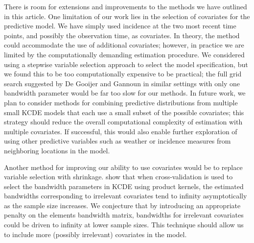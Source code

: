 \documentclass[times, doublespace]{simauth}\usepackage[]{graphicx}\usepackage[]{color}
\begin{document}
There is room for extensions and improvements to the methods we
have outlined in this article.  One limitation of our work lies in the
selection of covariates for the predictive model.  We have simply
used incidence at the two most recent time points, and possibly the observation
time, as covariates.  In theory, the method could accommodate the use of additional covariates; however, in practice we are limited by the computationally demanding estimation procedure.  We considered using a stepwise
variable selection approach to select the model specification,
but we found this to be too computationally expensive to be practical; the full
grid search suggested by De Gooijer and Gannoun
\cite{de2000nonparametricConditionalPredictiveRegions} in similar settings with only one bandwidth parameter would be far too slow for our methods.  In future work, we plan to consider methods for combining predictive distributions from multiple small KCDE models that each use a small subset of the possible covariates; this strategy should reduce the overall computational complexity of estimation with multiple covariates.  If successful, this would also enable further exploration of using other predictive variables such as weather or incidence measures from neighboring locations in the model.

Another method for improving our ability to use covariates would be to replace
variable selection with shrinkage.  \cite{hall2004crossvalidationKCDE}
show that when cross-validation is used to select the bandwidth parameters in
KCDE using product kernels, the estimated bandwidths corresponding to
irrelevant covariates tend to infinity asymptotically as the sample
size increases.  We conjecture
that by introducing an appropriate penalty on the elements bandwidth
matrix, bandwidths for irrelevant covariates could be driven to infinity
at lower sample sizes.  This technique should allow us to include more (possibly
irrelevant) covariates in the model.
\end{document}
